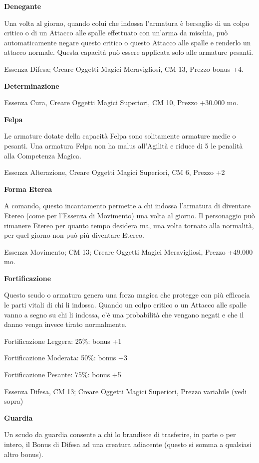 \documentclass[a4paper,11pt,twoside,openany]{book}
\begin{document}
\textbf{Denegante}

Una volta al giorno, quando colui che indossa l'armatura è bersaglio di un colpo critico o di un Attacco alle spalle effettuato con un'arma da mischia, può automaticamente negare questo critico o questo Attacco alle spalle e renderlo un attacco normale. Questa capacità può essere applicata solo alle armature pesanti.

Essenza Difesa; Creare Oggetti Magici Meravigliosi, CM 13, Prezzo bonus +4.

\textbf{Determinazione}

Essenza Cura, Creare Oggetti Magici Superiori, CM 10, Prezzo +30.000
mo.

\textbf{Felpa}

Le armature dotate della capacità Felpa sono solitamente armature medie o pesanti. Una armatura Felpa non ha malus all'Agilità e riduce di 5 le penalità alla Competenza Magica.

Essenza Alterazione, Creare Oggetti Magici Superiori, CM 6, Prezzo
+2

\textbf{Forma Eterea}

A comando, questo incantamento permette a chi indossa l'armatura di diventare Etereo (come per l'Essenza di Movimento) una volta al giorno. Il personaggio può rimanere Etereo per quanto tempo desidera ma, una volta tornato alla normalità, per quel giorno non può più diventare Etereo.

Essenza Movimento; CM 13; Creare Oggetti Magici Meravigliosi, Prezzo +49.000 mo.

\textbf{Fortificazione}

Questo scudo o armatura genera una forza magica che protegge con più efficacia le parti vitali di chi li indossa. Quando un colpo critico o un Attacco alle spalle vanno a segno su chi li indossa, c'è una probabilità che vengano negati e che il danno venga invece tirato normalmente.

Fortificazione Leggera: 25\%: bonus +1

Fortificazione Moderata: 50\%: bonus +3

Fortificazione Pesante: 75\%: bonus +5

Essenza Difesa, CM 13; Creare Oggetti Magici Superiori, Prezzo variabile (vedi sopra)

\textbf{Guardia}

Un scudo da guardia consente a chi lo brandisce di trasferire, in parte o per intero, il Bonus di Difesa ad una creatura adiacente (questo si somma a qualsiasi altro bonus).
\end{document}
